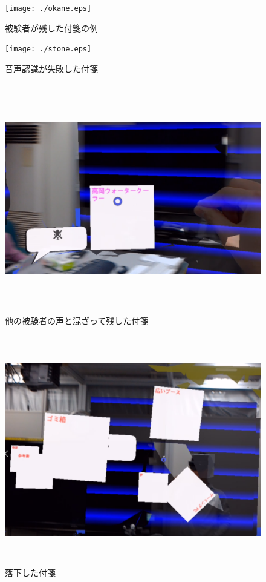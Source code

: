 \documentclass[11pt,a4j, titlepage]{jarticle} %
\begin{document}
\begin{figure}[H]
  \begin{center}
    \texttt{[image: ./okane.eps]}
    \caption{被験者が残した付箋の例}
    \label{fig:okane}
  \end{center}
\end{figure}

\begin{figure}[H]
  \begin{center}
    \texttt{[image: ./stone.eps]}
    \caption{音声認識が失敗した付箋}
    \label{fig:stone}
  \end{center}
\end{figure}

\begin{figure}[H]
  \begin{center}
    \includegraphics[clip,height=10.0cm,width=12.0cm]{./takaoka.eps}
    \caption{他の被験者の声と混ざって残した付箋}
    \label{fig:takaoka}
  \end{center}
\end{figure}

\begin{figure}[H]
  \begin{center}
    \includegraphics[clip,height=10.0cm,width=12.0cm]{./rakka.eps}
    \caption{落下した付箋}
    \label{fig:rakka}
  \end{center}
\end{figure}
\end{document}
